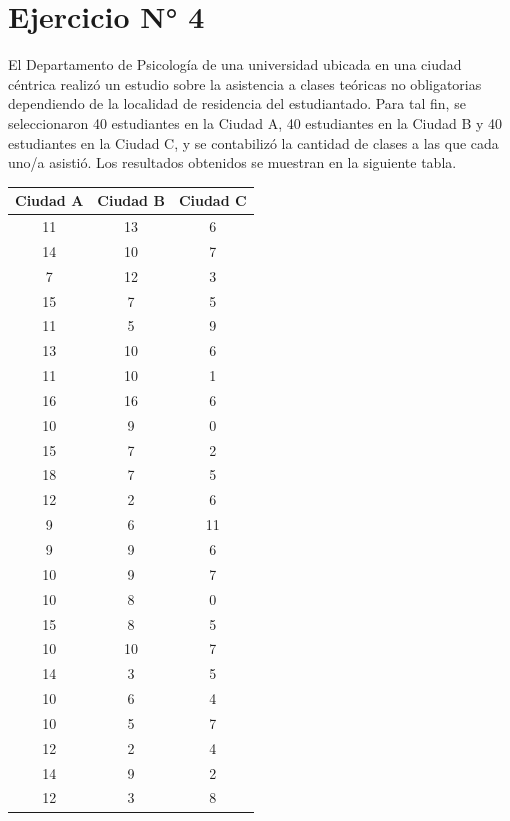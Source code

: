 \documentclass{article} %
\begin{document}
\section{Ejercicio N° 4}
El Departamento de Psicología de una universidad ubicada en una ciudad céntrica realizó un estudio sobre la asistencia a clases teóricas no obligatorias dependiendo de la localidad de residencia del estudiantado. Para tal fin, se seleccionaron 40 estudiantes en la Ciudad A, 40 estudiantes en la Ciudad B y 40 estudiantes en la Ciudad C, y se contabilizó la cantidad de clases a las que cada uno/a asistió. Los resultados obtenidos se muestran en la siguiente tabla.

\begin{table}[H]
	\centering
		\begin{tabular}{|| c | c | c ||}
			\hline
			\hline
			Ciudad A & Ciudad B & Ciudad C\\
			\hline
			\hline		
			11 & 13 & 6\\
			\hline
			14 & 10 & 7\\
			\hline
			7 & 12 & 3\\
			\hline
			15 & 7 & 5\\
			\hline
			11 & 5 & 9\\
			\hline
			13 & 10 & 6\\
			\hline
			11 & 10 & 1\\
			\hline
			16 & 16 & 6\\
			\hline
			10 & 9 & 0\\
			\hline
			15 & 7 & 2\\
			\hline
			18 & 7 & 5\\
			\hline
			12 & 2 & 6\\
			\hline
			9 & 6 & 11\\
			\hline
			9 & 9 & 6\\
			\hline
			10 & 9 & 7\\
			\hline
			10 & 8 & 0\\
			\hline
			15 & 8 & 5\\
			\hline
			10 & 10 & 7\\
			\hline
			14 & 3 & 5\\
            \hline
            10 & 6 & 4\\
            \hline
            10 & 5 & 7\\
            \hline
            12 & 2 & 4\\
            \hline
            14 & 9 & 2\\
            \hline
            12 & 3 & 8\\

\end{tabular}
\end{table}
\end{document}
